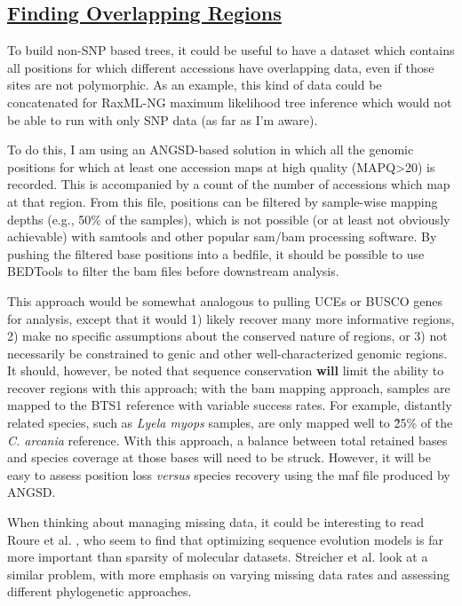 \documentclass[12pt]{report}
\begin{document}
\subsection*{\underline{Finding Overlapping Regions}}
To build non-SNP based trees, it could be useful to have a dataset which contains all positions for which different accessions have overlapping data, even if those sites are not polymorphic. As an example, this kind of data could be concatenated for RaxML-NG maximum likelihood tree inference which would not be able to run with only SNP data (as far as I'm aware).

To do this, I am using an ANGSD-based solution in which all the genomic positions for which at least one accession maps at high quality (MAPQ>20) is recorded. This is accompanied by a count of the number of accessions which map at that region. From this file, positions can be filtered by sample-wise mapping depths (e.g., 50\% of the samples), which is not possible (or at least not obviously achievable) with samtools and other popular sam/bam processing software. By pushing the filtered base positions into a bedfile, it should be possible to use BEDTools to filter the bam files before downstream analysis.

This approach would be somewhat analogous to pulling UCEs or BUSCO genes for analysis, except that it would 1) likely recover many more informative regions, 2) make no specific assumptions about the conserved nature of regions, or 3) not necessarily be constrained to genic and other well-characterized genomic regions. It should, however, be noted that sequence conservation \textbf{will} limit the ability to recover regions with this approach; with the bam mapping approach, samples are mapped to the BTS1 reference with variable success rates. For example, distantly related species, such as \emph{Lyela myops} samples, are only mapped well to \~ 25\% of the \emph{C. arcania} reference. With this approach, a balance between total retained bases and species coverage at those bases will need to be struck. However, it will be easy to assess position loss \emph{versus} species recovery using the maf file produced by ANGSD.

When thinking about managing missing data, it could be interesting to read Roure et al. \cite{roure2012}, who seem to find that optimizing sequence evolution models is far more important than sparsity of molecular datasets. Streicher et al. \cite{streicher2015} look at a similar problem, with more emphasis on varying missing data rates and assessing different phylogenetic approaches.
\end{document}
